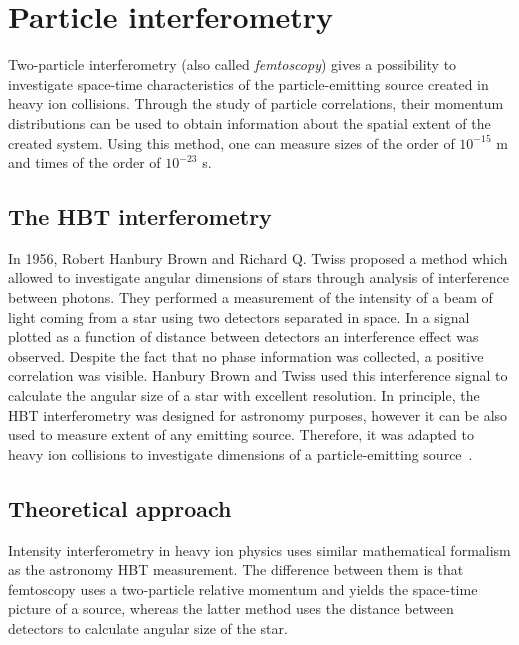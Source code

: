 %
\chapter{Particle interferometry}
\label{ch:pi}
  Two-particle interferometry (also called \textit{femtoscopy}) gives a possibility to investigate space-time characteristics of the particle-emitting source created in heavy ion collisions.
  Through the study of particle correlations, their momentum distributions can be used to obtain information about the spatial extent of the created system.
  Using this method, one can measure sizes of the order of $10^{-15}$ m and times of the order of $10^{-23}$ s.
  \section{The HBT interferometry}
    In 1956, Robert Hanbury Brown and Richard Q. Twiss proposed a method which allowed to investigate angular dimensions of stars through analysis of interference between photons.
    They performed a measurement of the intensity of a beam of light coming from a star using two detectors separated in space.
    In a signal plotted as a function of distance between detectors an interference effect was observed. Despite the fact that no phase information was collected, a positive correlation was visible.
    Hanbury Brown and Twiss used this interference signal to calculate the angular size of a star with excellent resolution.
    In principle, the HBT interferometry was designed for astronomy purposes, however it can be also used to measure extent of any emitting source.
    Therefore, it was adapted to heavy ion collisions to investigate dimensions of a particle-emitting source~\cite{drkisiel}.
  \section{Theoretical approach}
    Intensity interferometry in heavy ion physics uses similar mathematical formalism as the astronomy HBT measurement.
    The difference between them is that femtoscopy uses a two-particle relative momentum and yields the space-time picture of a source, whereas the latter method uses the distance between detectors to calculate angular size of the star.

